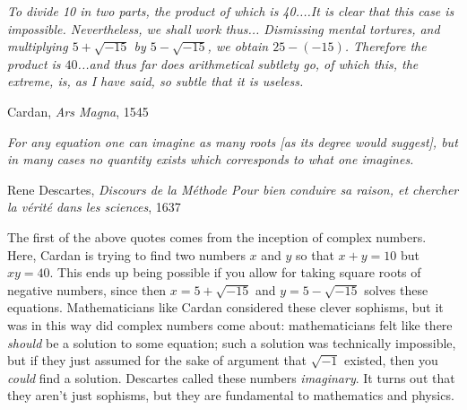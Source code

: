 \documentclass[11pt,dvipsnames]{book}
\numberwithin{equation}{section} %
\numberwithin{figure}{section} %
\numberwithin{table}{section} %
\begin{document}
\begin{multicols}{2}
\epigraph{\it     To divide 10 in two parts, the product of which is 40....It is clear that this case is impossible. Nevertheless, we shall work thus...
Dismissing mental tortures, and multiplying $5 + \sqrt{- 15}$ by $5 - \sqrt{-15}$, we obtain $25 - (-15)$. Therefore the product is $40$...and thus far does arithmetical subtlety go, of which this, the extreme, is, as I have said, so subtle that it is useless.}{Cardan, {\it Ars Magna}, 1545} 

\epigraph{\it For any equation one can imagine as many roots [as its degree would suggest], but in many cases no quantity exists which corresponds  to  what  one  imagines.}{Rene Descartes, {\it Discours de la M\'{e}thode Pour bien conduire sa raison, et chercher la v\'{e}rit\'{e} dans les sciences}, 1637} 
\end{multicols}


The first of the above quotes comes from the inception of complex numbers. Here, Cardan is trying to find two numbers $x$ and $y$ so that $x+y=10$ but $xy=40$. This ends up being possible if you allow for taking square roots of negative numbers, since then $x=5+\sqrt{-15}$ and $y=5-\sqrt{-15}$ solves these equations. Mathematicians like Cardan considered these clever sophisms, but it was in this way did complex numbers come about: mathematicians felt like there {\it should} be a solution to some equation; such a solution was technically impossible, but if they just assumed for the sake of argument that $\sqrt{-1}$ existed, then you {\it could} find a solution. Descartes called these numbers {\it imaginary}. It turns out that they aren't just sophisms, but they are fundamental to mathematics and physics. \\





%
\end{document}
